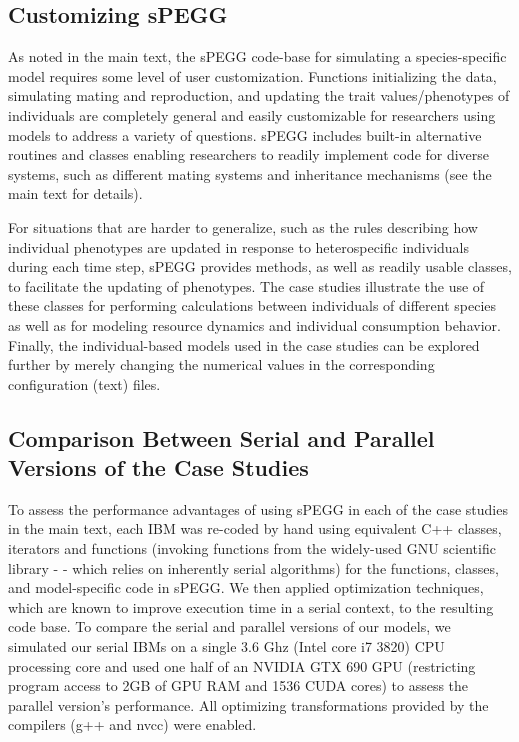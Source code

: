 \documentclass[1p,numbered]{article}
\begin{document}
\begin{linenumbers}
\subsection*{Customizing sPEGG}
As noted in the main text, the sPEGG code-base for simulating a species-specific model requires some level of user customization. Functions initializing the data, simulating mating and reproduction, and updating the trait values/phenotypes of individuals are completely general and easily customizable for researchers using models to address a variety of questions. sPEGG includes built-in alternative routines and classes enabling researchers to readily implement code for diverse systems, such as different mating systems and inheritance mechanisms (see the main text for details).

For situations that are harder to generalize, such as the rules describing how individual phenotypes are updated in response to heterospecific individuals during each time step, sPEGG provides methods, as well as readily usable classes, to facilitate the updating of phenotypes. The case studies illustrate the use of these classes for performing calculations between individuals of different species as well as for modeling resource dynamics and individual consumption behavior. Finally, the individual-based models used in the case studies can be explored further by merely changing the numerical values in the corresponding configuration (text) files.

\subsection*{Comparison Between Serial and Parallel Versions of the Case Studies}
To assess the performance advantages of using sPEGG in each of the case studies in the main text, each IBM was re-coded by hand using equivalent C++ classes, iterators and functions (invoking functions from the widely-used GNU scientific library - \citealt{gsl} - which relies on inherently serial algorithms) for the functions, classes, and model-specific code in sPEGG. We then applied optimization techniques, which are known to improve execution time in a serial context, to the resulting code base. To compare the serial and parallel versions of our models, we simulated our serial IBMs on a single 3.6 Ghz (Intel core i7 3820) CPU processing core and used one half of an NVIDIA GTX 690 GPU (restricting program access to 2GB of GPU RAM and 1536 CUDA cores) to assess the parallel version's performance. All optimizing transformations provided by the compilers (g++ and nvcc) were enabled. 

\end{linenumbers}

	

\end{document}

